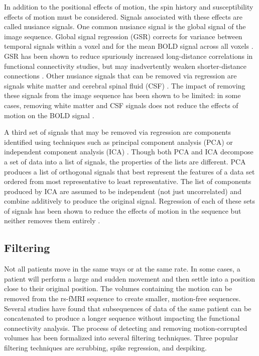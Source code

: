 In addition to the positional effects of motion, the spin history and susceptibility effects of motion must be considered. Signals associated with these effects are called nusiance signals. One common nusiance signal is the global signal of the image sequence. Global signal regression (GSR) corrects for variance between temporal signals within a voxel and for the mean BOLD signal across all voxels \cite{Power2014} \cite{Satterthwaite2013} \cite{Yan2013} \cite{Yan2013a}. GSR has been shown to reduce spuriously increased long-distance correlations in functional connectivity studies, but may inadvertently weaken shorter-distance connections \cite{Jo2013} \cite{Power2014}  \cite{Satterthwaite2012}. Other nusiance signals that can be removed via regression are signals white matter and cerebral spinal fluid (CSF) \cite{Power2014} \cite{Satterthwaite2013}. The impact of removing these signals from the image sequence has been shown to be limited: in some cases, removing white matter and CSF signals does not reduce the effects of motion on the BOLD signal \cite{Yan2013a} \cite{Jo2010}.

A third set of signals that may be removed via regression are components identified using techniques such as principal component analysis (PCA) or independent component analysis (ICA) \cite{Pruim2015} \cite{Salimi-Khorshidi2014} \cite{Behzadi2007}. Though both PCA and ICA decompose a set of data into a list of signals, the properties of the lists are different. PCA produces a list of orthogonal signals that best represent the features of a data set ordered from most representative to least representative. The list of components produced by ICA are assumed to be independent (not just uncorrelated) and combine additively to produce the original signal. Regression of each of these sets of signals has been shown to reduce the effects of motion in the sequence but neither removes them entirely \cite{Power2015} \cite{Parkes2017}. 

\subsection{Filtering}

Not all patients move in the same ways or at the same rate. In some cases, a patient will perform a large and sudden movement and then settle into a position close to their original position. The volumes containing the motion can be removed from the rs-fMRI sequence to create smaller, motion-free sequences. Several studies have found that subsequences of data of the same patient can be concatenated to produce a longer sequence without impacting the functional connectivity analysis. The process of detecting and removing motion-corrupted volumes has been formalized into several filtering techniques. 
Three popular filtering techniques are scrubbing, spike regression, and despiking. 

